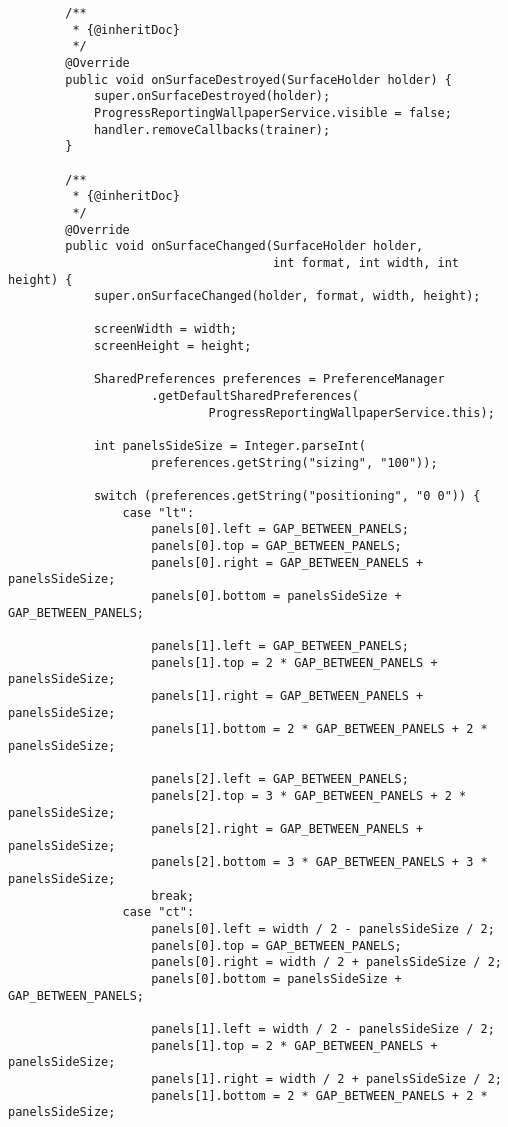 \begin{verbatim}
        /**
         * {@inheritDoc}
         */
        @Override
        public void onSurfaceDestroyed(SurfaceHolder holder) {
            super.onSurfaceDestroyed(holder);
            ProgressReportingWallpaperService.visible = false;
            handler.removeCallbacks(trainer);
        }

        /**
         * {@inheritDoc}
         */
        @Override
        public void onSurfaceChanged(SurfaceHolder holder,
                                     int format, int width, int height) {
            super.onSurfaceChanged(holder, format, width, height);

            screenWidth = width;
            screenHeight = height;

            SharedPreferences preferences = PreferenceManager
                    .getDefaultSharedPreferences(
                            ProgressReportingWallpaperService.this);

            int panelsSideSize = Integer.parseInt(
                    preferences.getString("sizing", "100"));

            switch (preferences.getString("positioning", "0 0")) {
                case "lt":
                    panels[0].left = GAP_BETWEEN_PANELS;
                    panels[0].top = GAP_BETWEEN_PANELS;
                    panels[0].right = GAP_BETWEEN_PANELS + panelsSideSize;
                    panels[0].bottom = panelsSideSize + GAP_BETWEEN_PANELS;

                    panels[1].left = GAP_BETWEEN_PANELS;
                    panels[1].top = 2 * GAP_BETWEEN_PANELS + panelsSideSize;
                    panels[1].right = GAP_BETWEEN_PANELS + panelsSideSize;
                    panels[1].bottom = 2 * GAP_BETWEEN_PANELS + 2 * panelsSideSize;

                    panels[2].left = GAP_BETWEEN_PANELS;
                    panels[2].top = 3 * GAP_BETWEEN_PANELS + 2 * panelsSideSize;
                    panels[2].right = GAP_BETWEEN_PANELS + panelsSideSize;
                    panels[2].bottom = 3 * GAP_BETWEEN_PANELS + 3 * panelsSideSize;
                    break;
                case "ct":
                    panels[0].left = width / 2 - panelsSideSize / 2;
                    panels[0].top = GAP_BETWEEN_PANELS;
                    panels[0].right = width / 2 + panelsSideSize / 2;
                    panels[0].bottom = panelsSideSize + GAP_BETWEEN_PANELS;

                    panels[1].left = width / 2 - panelsSideSize / 2;
                    panels[1].top = 2 * GAP_BETWEEN_PANELS + panelsSideSize;
                    panels[1].right = width / 2 + panelsSideSize / 2;
                    panels[1].bottom = 2 * GAP_BETWEEN_PANELS + 2 * panelsSideSize;


\end{verbatim}
